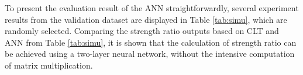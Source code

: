 
To present the evaluation result of the ANN straightforwardly, several
experiment results from the validation dataset are displayed in Table
\ref{tab:simu}, which are randomly selected.
 Comparing the strength ratio outputs based on CLT and ANN from Table
 \ref{tab:simu}, it is shown that the calculation of strength ratio can be
 achieved using a two-layer neural network, without the intensive computation of
 matrix multiplication.



